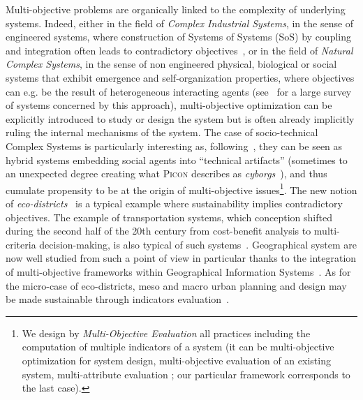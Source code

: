 \documentclass[runningheads,a4paper]{llncs2e/llncs}
\newcommand{\noun}[1]{\textsc{#1}}
\begin{document}
Multi-objective problems are organically linked to the complexity of underlying systems. Indeed, either in the field of \emph{Complex Industrial Systems}, in the sense of engineered systems, where construction of Systems of Systems (SoS) by coupling and integration often leads to contradictory objectives~\cite{marler2004survey}, or in the field of \emph{Natural Complex Systems}, in the sense of non engineered physical, biological or social systems that exhibit emergence and self-organization properties, where objectives can e.g. be the result of heterogeneous interacting agents (see~\cite{newman2011complex} for a large survey of systems concerned by this approach), multi-objective optimization can be explicitly introduced to study or design the system but is often already implicitly ruling the internal mechanisms of the system. The case of socio-technical Complex Systems is particularly interesting as, following~\cite{haken2003face}, they can be seen as hybrid systems embedding social agents into ``technical artifacts'' (sometimes to an unexpected degree creating what \noun{Picon} describes as \emph{cyborgs}~\cite{picon2013smart}), and thus cumulate propensity to be at the origin of multi-objective issues\footnote{We design by \emph{Multi-Objective Evaluation} all practices including the computation of multiple indicators of a system (it can be multi-objective optimization for system design, multi-objective evaluation of an existing system, multi-attribute evaluation ; our particular framework corresponds to the last case).}. The new notion of \emph{eco-districts}~\cite{souami2012ecoquartiers} is a typical example where sustainability implies contradictory objectives. The example of transportation systems, which conception shifted during the second half of the 20th century from cost-benefit analysis to multi-criteria decision-making, is also typical of such systems~\cite{bavoux2005geographie}. Geographical system are now well studied from such a point of view in particular thanks to the integration of multi-objective frameworks within Geographical Information Systems~\cite{carver1991integrating}. As for the micro-case of eco-districts, meso and macro urban planning and design may be made sustainable through indicators evaluation~\cite{jegou2012evaluation}.
\end{document}
